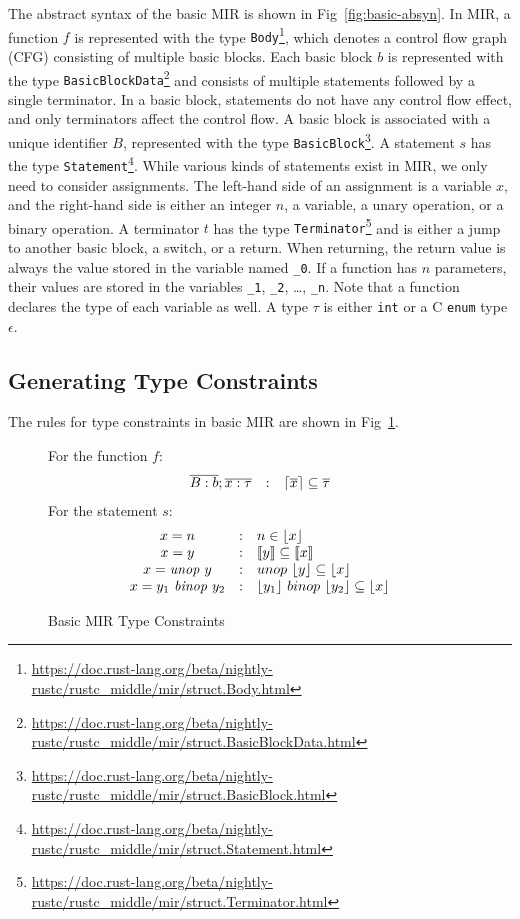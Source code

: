 \documentclass[peerreview, 10pt]{IEEEtran}
\newcommand{\C}[1]{{\small\tt #1}}
\newcommand{\cons}[1]{\ensuremath{\llbracket#1\rrbracket}}
\newcommand{\floor}[1]{\ensuremath{\lfloor#1\rfloor}}
\newcommand{\ceil}[1]{\ensuremath{\lceil#1\rceil}}
\newcommand{\ifrule}[2]{\ensuremath{#1&:&#2}}
\begin{document}
The abstract syntax of the basic MIR is shown in Fig~\ref{fig:basic-absyn}.
%
In MIR, a function $f$ is represented with the type
\C{Body}\footnote{\url{https://doc.rust-lang.org/beta/nightly-rustc/rustc\_middle/mir/struct.Body.html}},
which denotes a control flow graph (CFG) consisting of multiple basic blocks.
%
Each basic block $b$ is represented with the type
\C{BasicBlockData}\footnote{\url{https://doc.rust-lang.org/beta/nightly-rustc/rustc\_middle/mir/struct.BasicBlockData.html}}
and consists of multiple statements followed by a single terminator.
%
In a basic block, statements do not have any control flow effect, and only
terminators affect the control flow.
%
A basic block is associated with a unique identifier $B$, represented with the
type
\C{BasicBlock}\footnote{\url{https://doc.rust-lang.org/beta/nightly-rustc/rustc\_middle/mir/struct.BasicBlock.html}}.
%
A statement $s$ has the type
\C{Statement}\footnote{\url{https://doc.rust-lang.org/beta/nightly-rustc/rustc_middle/mir/struct.Statement.html}}.
%
While various kinds of statements exist in MIR, we only need to consider
assignments.
%
The left-hand side of an assignment is a variable $x$, and the right-hand side
is either an integer $n$, a variable, a unary operation, or a binary operation.
%
A terminator $t$ has the type
\C{Terminator}\footnote{\url{https://doc.rust-lang.org/beta/nightly-rustc/rustc\_middle/mir/struct.Terminator.html}}
and is either a jump to another basic block, a switch, or a return.
%
When returning, the return value is always the value stored in the variable
named \C{\_0}.
%
If a function has $n$ parameters, their values are stored in the variables
\C{\_1}, \C{\_2}, \ldots, \C{\_n}.
%
Note that a function declares the type of each variable as well.
%
A type $\tau$ is either \C{int} or a C \C{enum} type $\epsilon$.

\subsection{Generating Type Constraints}

The rules for type constraints in basic MIR are shown in Fig~\ref{fig:basic-type-constraints}.

\begin{figure}[ht]
\begin{framed}
For the function $f$:
\[
\begin{array}{@{}ccl@{}}
  \ifrule{\overline{B:b};\overline{x:\tau}}{\ceil{\overline{x}}\subseteq\overline{\tau}}\\
\end{array}
\]
For the statement $s$:
\[
\begin{array}{@{}ccl@{}}
  \ifrule{x=n}{n\in\floor{x}}\\
  \ifrule{x=y}{\cons{y}\subseteq\cons{x}}\\
  \ifrule{x={\it unop}\ y}{unop\ \floor{y}\subseteq\floor{x}}\\
  \ifrule{x=y_1\ {\it binop}\ y_2}{\floor{y_1}\ binop\ \floor{y_2}\subseteq\floor{x}}
\end{array}
\]
\end{framed}
\caption{Basic MIR Type Constraints}
\label{fig:basic-type-constraints}
\end{figure}
\end{document}
